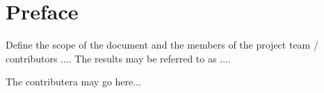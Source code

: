 \section*{Preface}
Define the scope of the document and the members of the project team / contributors .... The results may be referred to as ....\par
\blindtext
The contributera may go here...
\blinditemize
\blindtext[1]